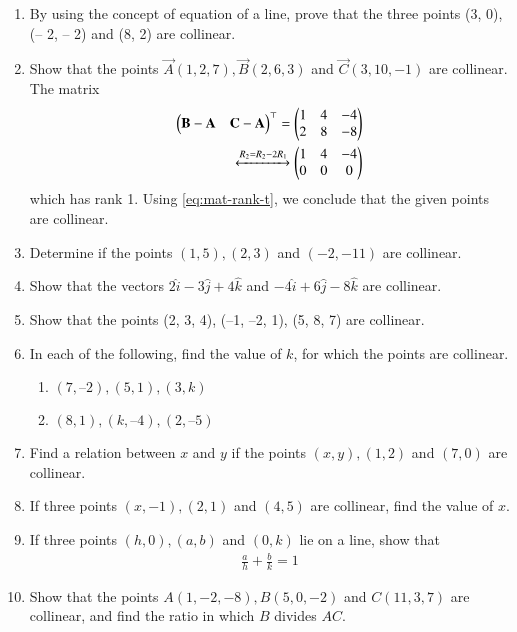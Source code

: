 \begin{enumerate}[label=\thesubsection.\arabic*,ref=\thesubsection.\theenumi]
\item 
 By using the concept of equation of a line, prove that the three points (3, 0), (– 2, – 2) and (8, 2) are collinear.
\label{chapters/11/10/2/20}
	\\
	\solution 

\item Show that the points $\vec{A}(1,2,7), \vec{B}(2,6,3)$ and $\vec{C}(3,10,-1)$ are collinear.
	\\
		\solution The matrix
\begin{align}
	\begin{pmatrix}\mathbf{B}-\mathbf{A}& \mathbf{C}-\mathbf{A}\end{pmatrix}^\top 
	= \begin{pmatrix}1 & 4 & -4 \\ 2 & 8 & -8\end{pmatrix}
	\\
	\xleftrightarrow[]{R_2 = R_2 - 2R_1}
	 \begin{pmatrix}1 & 4 & -4 \\ 0 & 0 & 0\end{pmatrix}
\end{align}
which has rank 1.  Using 
			\eqref{eq:mat-rank-t},
			 we conclude that the given points are collinear.
\item Determine if the points $(1,5),(2,3)$ and $(-2,-11)$ are collinear.
\item Show that the vectors $2\hat{i}-3\hat{j}+4\hat{k}$ and $-4\hat{i}+6\hat{j}-8\hat{k}$ are collinear.
\item Show that the points (2, 3, 4), (–1, –2, 1), (5, 8, 7) are collinear.
\item In each of the following, find the value of $k$, for which the points are collinear.
\begin{enumerate}
\item $(7, –2), (5, 1), (3, k)$
\item $(8, 1), (k, – 4), (2, –5)$
\end{enumerate}
		\label{10/7/3/2}
\item Find a relation between $x$ and $y$ if the points $(x, y), (1, 2)$  and  $(7, 0)$ are collinear.
\item If three points $(x, -1), (2, 1)$ and $(4, 5)$ are collinear, find the value of $x$.
\label{chapters/11/10/1/8}
\item If three points $(h, 0), (a, b)$ and $(0, k)$ lie on a line, 
show that 
\begin{align}
\frac{a}{h}+\frac{b}{k}=1
\end{align}
\label{chapters/11/10/1/13}
\item Show that the points $A (1, -2, -8), B (5, 0, -2)$ and $C (11, 3, 7)$ are collinear, and find the ratio in which $B$ divides $AC$.

\end{enumerate}
